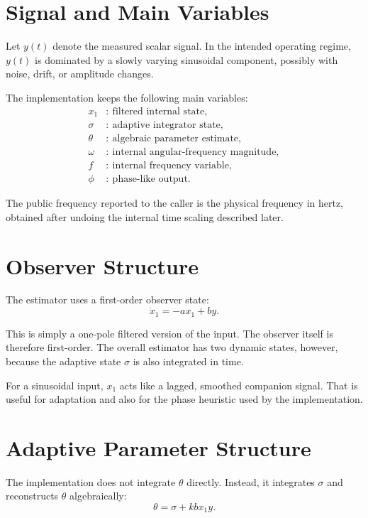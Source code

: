 \documentclass[conference]{IEEEtran}
\begin{document}
\section{Signal and Main Variables}

Let $y(t)$ denote the measured scalar signal. In the intended operating
regime, $y(t)$ is dominated by a slowly varying sinusoidal component,
possibly with noise, drift, or amplitude changes.

The implementation keeps the following main variables:
\begin{align}
  x_1 &:\ \text{filtered internal state},\\
  \sigma &:\ \text{adaptive integrator state},\\
  \theta &:\ \text{algebraic parameter estimate},\\
  \omega &:\ \text{internal angular-frequency magnitude},\\
  f &:\ \text{internal frequency variable},\\
  \phi &:\ \text{phase-like output}.
\end{align}

The public frequency reported to the caller is the physical frequency in hertz,
obtained after undoing the internal time scaling described later.

\section{Observer Structure}

The estimator uses a first-order observer state:
\begin{equation}
  \dot{x}_1 = -a x_1 + b y.
\end{equation}

This is simply a one-pole filtered version of the input. The observer itself
is therefore first-order. The overall estimator has two dynamic states,
however, because the adaptive state $\sigma$ is also integrated in time.

For a sinusoidal input, $x_1$ acts like a lagged, smoothed companion signal.
That is useful for adaptation and also for the phase heuristic used by the
implementation.

\section{Adaptive Parameter Structure}

The implementation does not integrate $\theta$ directly. Instead, it
integrates $\sigma$ and reconstructs $\theta$ algebraically:
\begin{equation}
  \theta = \sigma + k b x_1 y.
\end{equation}
\end{document}
